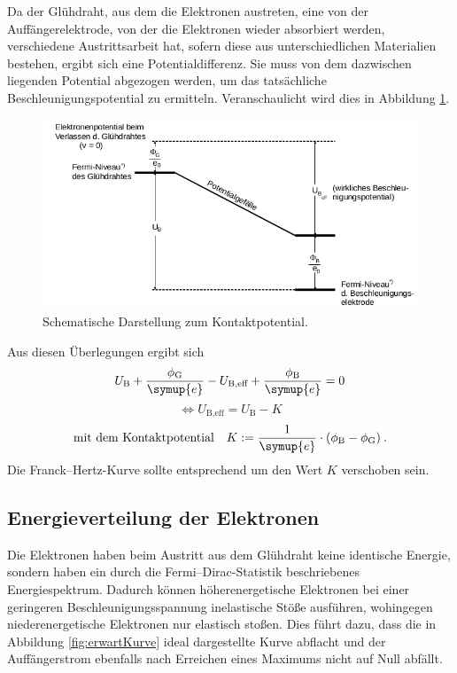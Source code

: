 Da der Glühdraht, aus dem die Elektronen austreten, eine von der Auffängerelektrode, von der die Elektronen wieder 
absorbiert werden, verschiedene Austrittsarbeit hat, sofern diese aus unterschiedlichen Materialien bestehen, ergibt 
sich eine Potentialdifferenz. Sie muss von dem dazwischen liegenden Potential abgezogen werden, um das tatsächliche 
Beschleunigungspotential zu ermitteln. 
Veranschaulicht wird dies in Abbildung \ref{fig:Kontaktpotential}.
\begin{figure}
    \centering
    \includegraphics[width=\textwidth]{plots/Kontaktpotential.png}
    \caption{Schematische Darstellung zum Kontaktpotential\cite{Versuchsanleitung}.}
    \label{fig:Kontaktpotential}
\end{figure}
Aus diesen Überlegungen ergibt sich 
\begin{equation*}
    U_\text{B}+\frac{\phi_\text{G}}{\symup{e}} -U_\text{B,eff}+\frac{\phi_\text{B}}{\symup{e}}=0
\end{equation*}
\begin{equation*}
    \Leftrightarrow U_\text{B,eff}=U_\text{B}-K
\end{equation*}
\begin{equation*}
    \text{mit dem Kontaktpotential} \quad K:=\frac{1}{\symup{e}}\cdot (\phi_\text{B}-\phi_\text{G})\:.
\end{equation*}
Die Franck--Hertz-Kurve sollte entsprechend um den Wert $K$ verschoben sein. 

\subsection{Energieverteilung der Elektronen}

Die Elektronen haben beim Austritt aus dem Glühdraht keine identische Energie, sondern haben ein durch die Fermi--Dirac-Statistik 
beschriebenes Energiespektrum. 
Dadurch können höherenergetische Elektronen bei einer geringeren Beschleunigungsspannung inelastische Stöße ausführen, 
wohingegen niederenergetische Elektronen nur elastisch stoßen. Dies führt dazu, dass die in Abbildung \ref{fig:erwartKurve}
ideal dargestellte Kurve abflacht und der Auffängerstrom ebenfalls nach Erreichen eines Maximums nicht auf Null abfällt. 

